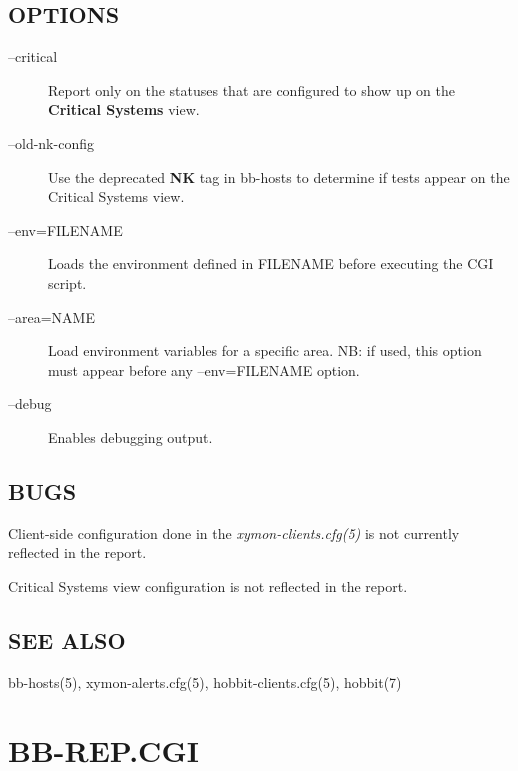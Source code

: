 \subsection{OPTIONS}
\begin{description}
\item[--critical] Report only on the statuses that are configured to
  show up on the \textbf{Critical Systems} view. 

 

\item[--old-nk-config] Use the deprecated \textbf{NK}
 tag in bb-hosts to determine if tests appear on the Critical Systems view. 

 

\item[--env=FILENAME] Loads the environment defined in FILENAME before
  executing the CGI script. 


 

\item[--area=NAME] Load environment variables for a specific area. NB:
  if used, this option must appear before any --env=FILENAME option. 


\item[--debug] Enables debugging output. 

 

\end{description}
\subsection{BUGS}
 Client-side configuration done in the \emph{xymon-clients.cfg(5)}
 is not currently reflected in the report. 

  Critical Systems view configuration is not reflected in the report. 


 
\subsection{SEE ALSO}
bb-hosts(5), xymon-alerts.cfg(5), hobbit-clients.cfg(5), hobbit(7) 



%
\newpage
\section{BB-REP.CGI}

